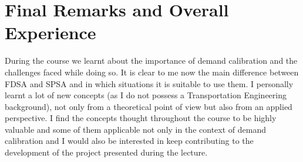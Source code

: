
\chapter{Final Remarks and Overall Experience}\label{chapter:conclusion}
During the course we learnt about the importance of demand calibration and the challenges faced while doing so. It is clear to me now the main difference between FDSA and SPSA and in which situations it is suitable to use them. I personally learnt a lot of new concepts (as I do not possess a Transportation Engineering background), not only from a theoretical point of view but also from an applied perspective. I find the concepts thought throughout the course to be highly valuable and some of them applicable not only in the context of demand calibration and I would also be interested in keep contributing to the development of the project presented during the lecture. 